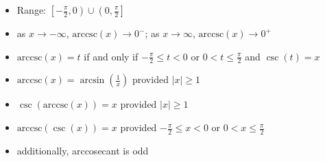 {\begin{thm}
\begin{itemize}
\begin{itemize}
\item Range:  $\left[-\frac{\pi}{2}, 0 \right) \cup \left(0, \frac{\pi}{2} \right]$

\item  as $x \rightarrow -\infty$, $\mbox{arccsc}(x) \rightarrow 0^{-}$;  as $x \rightarrow \infty$, $\mbox{arccsc}(x) \rightarrow 0^{+}$

\item  $\mbox{arccsc}(x) = t$ if and only if $-\frac{\pi}{2} \leq t < 0$ or $0 < t \leq \frac{\pi}{2}$ and $\csc(t) = x$

\item  $\mbox{arccsc}(x) = \arcsin\left(\frac{1}{x}\right)$ provided $|x| \geq 1$

\item  $\csc\left(\mbox{arccsc}(x)\right) = x$ provided $|x| \geq 1$

\item  $\mbox{arccsc}(\csc(x)) = x$ provided $-\frac{\pi}{2} \leq x < 0$ or $0 < x \leq \frac{\pi}{2}$

\item additionally, arccosecant is odd

\end{itemize}

\end{itemize}

\end{thm}

\ebm}

\medskip

